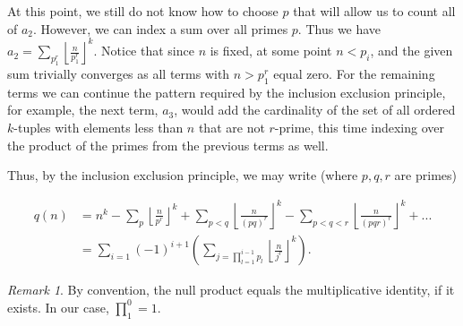 \documentclass[10pt,a4paper]{article}
\theoremstyle{definition}
\theoremstyle{remark}
\newtheorem{remark}{Remark}
\begin{document}
	At this point, we still do not know how to choose \(p\) that will allow us to count all of \(a_2\). However, we can index a sum over all primes \(p\). Thus we have  \(a_2=\sum_{p_{1}^r}\left\lfloor \frac{n}{p_{1}^r}\right\rfloor^k\).
	Notice that since $n$ is fixed, at some point \(n<p_i\), and the given sum trivially converges as all terms with $n > p_1^r$ equal zero.
	For the remaining terms we can continue the pattern required by the inclusion exclusion principle, for example, the next term, \(a_3\), would add the cardinality of the set of all ordered \(k\)-tuples with elements less than \(n\) that are not \(r\)-prime, this time indexing over the product of the primes from the previous terms as well.
	
	Thus, by the inclusion exclusion principle, we may write (where $p,q,r$ are primes)
	
		\begin{align}
		q(n) &= n^k-\sum_p \left\lfloor \frac{n}{p^r}\right\rfloor^k + \sum_{p < q}\left\lfloor \frac{n}{(pq)^r}\right\rfloor^k - \sum_{p < q < r}\left\lfloor \frac{n}{(pqr)^r}\right\rfloor^k +...\\ & =\sum_{i=1}(-1)^{i+1}\left(\sum_{j= \prod_{l=1}^{i-1}p_l}\left\lfloor\frac{n}{j^r}\right\rfloor^k\right).
	\end{align}
\begin{remark}
By convention, the null product equals the multiplicative identity, if it exists. In our case, \(\prod_{1}^{0}=1\).
\end{remark}
\end{document}
